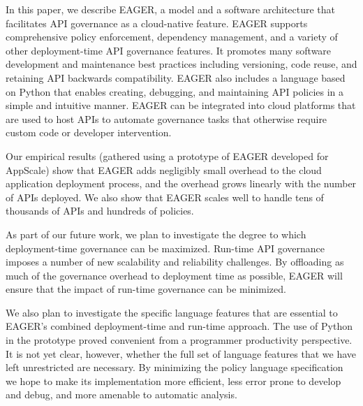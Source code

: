 In this paper, we describe EAGER, a model and a software architecture that 
facilitates API governance as a cloud-native feature. EAGER supports comprehensive policy
enforcement, dependency management, and a variety of other deployment-time API
governance features. It promotes many software development and maintenance
best practices including versioning, code reuse, and retaining API backwards
compatibility. EAGER also includes a language based on Python that enables
creating, debugging, and maintaining API policies in a simple and intuitive
manner. EAGER can be integrated into cloud platforms that are used to host APIs
to automate governance tasks that otherwise require custom code or developer intervention.

Our empirical results (gathered using a prototype of EAGER developed for AppScale)
show that EAGER adds negligibly small overhead to the cloud application 
deployment process, and the overhead grows linearly
with the number of APIs deployed. We also show that EAGER scales well 
to handle tens of thousands of APIs and hundreds of policies. 


As part of our future work, we plan to investigate the degree to which
deployment-time governance can be maximized.
Run-time API governance imposes a number of new scalability and
reliability challenges.  By offloading as much of the governance overhead to
deployment time as possible, EAGER will ensure that the impact of run-time
governance can be minimized.  

We also plan to investigate the specific language features that are essential
to EAGER's combined deployment-time and run-time approach.  The use of Python
in the prototype proved convenient from a programmer productivity perspective.
It is not yet clear, however, whether the full set of language features that
we have left unrestricted are necessary.  By minimizing the policy language
specification we hope to make its implementation more efficient, less
error prone to develop and debug, and more amenable to automatic analysis.

